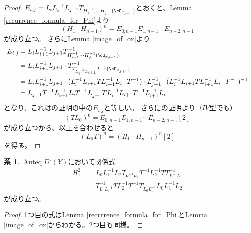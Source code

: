 \documentclass[uplatex, a4paper, dvipdfmx]{jsarticle}
\theoremstyle{definition}
\newtheorem{corollary}[theorem]{系}
\DeclareMathOperator{\Auteq}{\mathrm{Auteq}}
\begin{document}
\begin{proof}
    $E_{i, j} = L_{i}L_i^{-1}L_{j+1} T_{H_{i+1}^{-1}\cdots H_{j}^{-1}(\cO_{x_{j+1}})}$とおくと、Lemma \ref{recurrence_formula_for_Phi}より
    \begin{equation}
        (H_1 \cdots H_{n-1})^n = E_{0, n-1}E_{1, n-1}\cdots E_{n-2, n-1}
    \end{equation}
    が成り立つ。
    さらにLemma \ref{image_of_ox}より
    \begin{align}
        E_{i, j} & = L_{i}L_{i+1}^{-1}L_{j+1} T_{H_{i+1}^{-1}\cdots H_{j}^{-1}(\cO_{x_{j+1}})}^{-1}                                                                                \\
                 & =L_{i}L_{i+1}^{-1}L_{j+1} \cdot T_{T_{L_i^{-1}L_{i+1}} T^{-1}(\cO_{x_{j+1}})}^{-1}                                                                              \\
                 & = L_{i}L_{i+1}^{-1}L_{j+1} \cdot (L_i^{-1}L_{i+1} T L_{i+1}^{-1}L_i \cdot T^{-1}) \cdot L_{j+1}^{-1}\cdot (L_i^{-1}L_{i+1} T L_{i+1}^{-1}L_i \cdot T^{-1})^{-1} \\
                 & = L_{j+1}T^{-1} L_{i+1}^{-1}L_i T^{-1}L_{j+1}^{-1}TL_i^{-1}L_{i+1}T^{-1}L_{i+1}^{-1}L_i
    \end{align}
    となり、これは\cite[Theorem 3.6]{MR3182005}の証明の中の$E_{i,j}$と等しい。
    さらに\cite[Theorem 3.6]{MR3182005}の証明より（$IV$型でも）
    \begin{equation}
        (TL_0)^6 = E_{0, n-1}E_{1, n-1}\cdots E_{n-2, n-1}[2]
    \end{equation}
    が成り立つから、以上を合わせると
    \begin{equation}
        (L_0T)^n = (H_1\cdots H_{n-1})^n[2]
    \end{equation}
    を得る。
\end{proof}
\begin{corollary}\label{H^2}
    $\Auteq D^b(Y)$において関係式
    \begin{align}
        H_1^2 & = L_0L_1^{-1}L_2T_{L_0^{-1}L_1}T^{-1}L_2^{-1}T T_{L_0^{-1}L_1}^{-1} \\
              & =T_{L_0L_1^{-1}}^{-1}TL_2^{-1}T^{-1}T_{L_0L_1^{-1}}L_0L_1^{-1}L_2
    \end{align}
    が成り立つ。
\end{corollary}
\begin{proof}
    1つ目の式はLemma \ref{recurrence_formula_for_Phi}とLemma \ref{image_of_ox}からわかる。2つ目も同様。
\end{proof}
\end{document}
